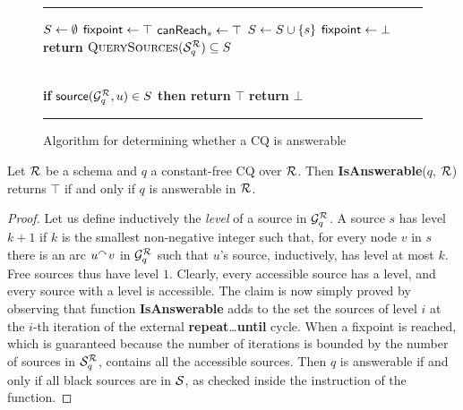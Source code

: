 %
\begin{figure}[t]\label{fig:algo-constants}
\rule{\textwidth}{0.075mm}
\begin{algorithmic}
    \Let $S \setq \emptyset$
    \Repeat
        \Let $\var{fixpoint} \setq \top$
            \Let $\var{canReach}_s \setq \top$
            \EndFor
                \Let $S \setq S \cup \{ s \}$
                \Let $\var{fixpoint} \setq \bot$
            \EndIf
        \EndFor
    \State \textbf{return} $\Call{QuerySources}{\SqR} \subseteq S$
\EndFunction

\\

        \State \textbf{if} $\source(\GqR, u) \in S$ 
                \textbf{then return} $\top$
    \EndFor
    \State \textbf{return} $\bot$
\EndFunction
\end{algorithmic}
\rule{\textwidth}{0.075mm}
\caption{Algorithm for determining whether a CQ is answerable}
\end{figure}
%
\begin{proposition}\label{pro:algo-answerability-correct}
	Let $\R$ be a schema and $q$ a constant-free CQ over $\R$.
	Then \textbf{IsAnswerable}($q$, $\R$) returns $\top$ if and only if $q$ is answerable in $\R$.
\end{proposition}
\begin{proof}
	Let us define inductively the \emph{level} of a source in $\GqR$.
 	A source $s$ has level $k+1$ if $k$ is the smallest non-negative integer such that, for every node $v$ in $s$ there is an arc $u\arc v$ in $\GqR$ such that $u$'s source, inductively, has level at most $k$. Free sources thus have level $1$.
	Clearly, every accessible source has a level, and every source with a level is accessible.
	The claim is now simply proved by observing that function \textbf{IsAnswerable} adds to the set  the sources of level $i$ at the $i$-th iteration of the external \textbf{repeat}\dots \textbf{until} cycle. When a fixpoint is reached, which is guaranteed because the number of iterations is bounded by the number of sources in $\SqR$,  contains all the accessible sources. Then $q$ is answerable if and only if all black sources are in $\S$, as checked inside the \codereturn instruction of the function.
\end{proof}

